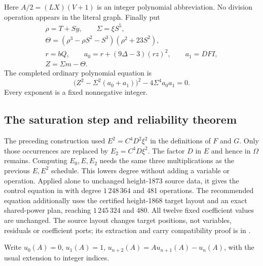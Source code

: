 Here $A/2=(LX)(V+1)$ is an integer polynomial abbreviation. No division
operation appears in the literal graph. Finally put
\begin{gather*}
 \rho=T+Sy,\qquad \Sigma=\xi S^5,\\
 \Theta=(\rho^3-\rho S^2-S^3)(\rho^2+23S^2),\\
 r=bQ,\qquad a_0=r+(9\Delta-3)(rz)^2,\qquad a_1=DFI,\\
 Z=\Sigma m-\Theta.
\end{gather*}
The completed ordinary polynomial equation is
\begin{equation}\label{eq:ten}
 \boxed{\bigl(Z^2-\Sigma^2(a_0+a_1)\bigr)^2
              -4\Sigma^4a_0a_1=0.}
\end{equation}
Every exponent is a fixed nonnegative integer.

\subsection{The saturation step and reliability theorem}
The preceding construction used $E^2=C^4D^2\xi^2$ in the definitions of
$F$ and $G$. Only those occurrences are replaced by
$E_2=C^4D\xi^2$. The factor $D$ in $E$ and hence in $\Omega$ remains.
Computing $E_0,E,E_2$ needs the same three multiplications as the previous
$E,E^2$ schedule. This lowers degree without adding a variable or operation. Applied alone to
unchanged height-1873 source data, it gives the control equation in
 with degree $1\,248\,364$ and 481 operations. The
recommended equation additionally uses the certified height-1868 target
layout and an exact shared-power plan, reaching $1\,245\,324$ and 480.
All twelve fixed coefficient values are unchanged. The source layout
changes target positions, not variables, residuals or coefficient ports;
its extraction and carry compatibility proof is in
.

Write $u_0(A)=0$, $u_1(A)=1$,
$u_{n+2}(A)=Au_{n+1}(A)-u_n(A)$, with the usual extension to integer indices.

